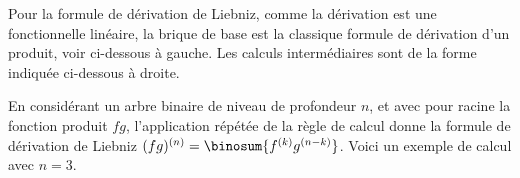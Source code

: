 Pour la formule de dérivation de Liebniz, comme la dérivation est une fonctionnelle linéaire, la brique de base est la classique formule de dérivation d'un produit, voir ci-dessous à gauche. Les calculs intermédiaires sont de la forme indiquée ci-dessous à droite.

%
            {\intertree}{\prodder}


En considérant un arbre binaire de niveau de profondeur $n$, et avec pour racine la fonction produit $f g$, l'application répétée de la règle de calcul donne la formule de dérivation de Liebniz 
$(fg)^{(n)} = \binosum{f^{(k)} g^{(n-k)}}$.
%
Voici un exemple de calcul avec $n=3$.

\binotree{\prodder}



